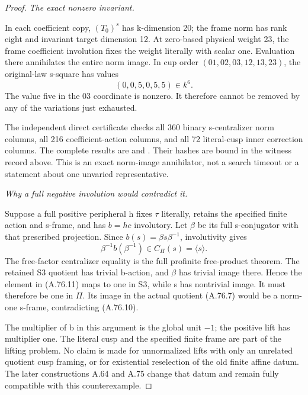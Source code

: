 \begin{proof}
\emph{The exact nonzero invariant.}\par
In each coefficient copy, \((T_0)^s\) has k-dimension 20;
the frame norm has rank eight and invariant target dimension 12.
At zero-based physical weight 23, the frame coefficient involution
fixes the weight literally with scalar one. Evaluation there
annihilates the entire norm image. In cup order
\((01,02,03,12,13,23)\), the original-law s-square has values
\[
                           (0,0,5,0,5,5)\in k^6.
 \tag{A.76.10}
\]
The value five in the 03 coordinate is nonzero. It therefore
cannot be removed by any of the variations just exhausted.

The independent direct certificate
checks all 360 binary s-centralizer norm columns, all 216
coefficient-action columns, and all 72 literal-cusp inner
correction columns. The complete results are
and .
Their hashes are bound in the witness record above. This is an
exact norm-image annihilator, not a search timeout or a statement
about one unvaried representative.

\emph{Why a full negative involution would contradict it.}\par
Suppose a full positive peripheral h fixes \(\tau\) literally,
retains the specified finite action and s-frame, and has
\(b=hc\) involutory. Let \(\beta\) be its full s-conjugator
with that prescribed projection. Since
\(b(s)=\beta s\beta^{-1}\), involutivity gives
\[
              \beta^{-1}b(\beta^{-1})\in C_\Pi(s)=\langle s\rangle.
 \tag{A.76.11}
\]
The free-factor centralizer equality is the full profinite
free-product theorem.\cite{A_HR1985}
The retained S3 quotient has trivial b-action, and \(\beta\)
has trivial image there. Hence the element in (A.76.11) maps to
one in S3, while s has nontrivial image. It must therefore be
one in \(\Pi\). Its image in the actual quotient (A.76.7) would
be a norm-one s-frame, contradicting (A.76.10).

The multiplier of b in this argument is the global unit \(-1\);
the positive lift has multiplier one. The literal cusp and the
specified finite frame are part of the lifting problem. No claim
is made for unnormalized lifts with only an unrelated quotient
cusp framing, or for existential reselection of the old finite
affine datum. The later constructions A.64 and A.75 change that
datum and remain fully compatible with this counterexample.
\end{proof}
